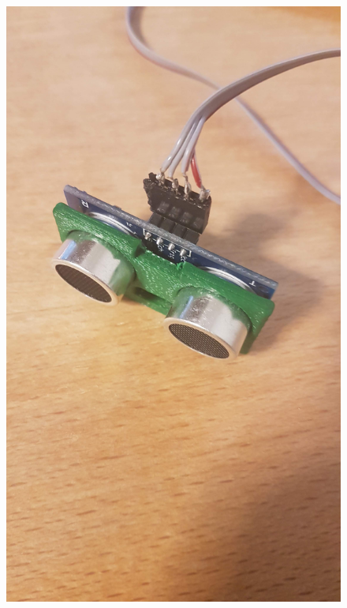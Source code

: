 \begin{figure}[h]%
\begin{minipage}{.5\textwidth}
	\includegraphics[width = 1\textwidth]{"assets/sonicmount_inside_A"}
	\centering
	

\end{minipage}
\end{figure}
